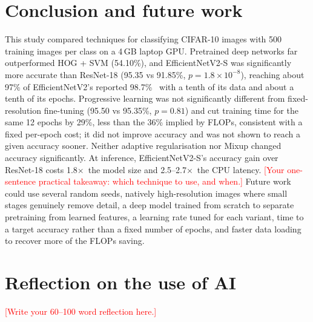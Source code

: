 \documentclass{COMPXXXX}
\newcommand{\sx}{$\times$}
\begin{document}
\section{Conclusion and future work}
This study compared techniques for classifying CIFAR-10 images with 500 training images per class on a
4\,GB laptop GPU. Pretrained deep networks far outperformed HOG + SVM (54.10\%), and EfficientNetV2-S was
significantly more accurate than ResNet-18 (95.35 vs 91.85\%, $p=1.8{\times}10^{-8}$), reaching about 97\%
of EfficientNetV2's reported 98.7\%~\cite{tan2021efficientnetv2} with a tenth of its data and about a
tenth of its epochs. Progressive learning was not significantly different from fixed-resolution
fine-tuning (95.50 vs 95.35\%, $p=0.81$) and cut training time for the same 12 epochs by 29\%, less
than the 36\% implied by FLOPs, consistent with a fixed per-epoch cost; it did not improve accuracy
and was not shown to reach a given accuracy sooner. Neither adaptive regularisation nor Mixup changed
accuracy significantly. At inference, EfficientNetV2-S's accuracy gain over ResNet-18 costs 1.8\sx\
the model size and 2.5--2.7\sx\ the CPU latency.
\textcolor{red}{[Your one-sentence practical takeaway: which technique to use, and when.]}
Future work could use several random seeds, natively high-resolution images where small stages
genuinely remove detail, a deep model trained from scratch to separate pretraining from learned
features, a learning rate tuned for each variant, time to a target accuracy rather than a fixed
number of epochs, and faster data loading to recover more of the FLOPs saving.

\section*{Reflection on the use of AI}
\textcolor{red}{[Write your 60--100 word reflection here.]}


\end{document}
